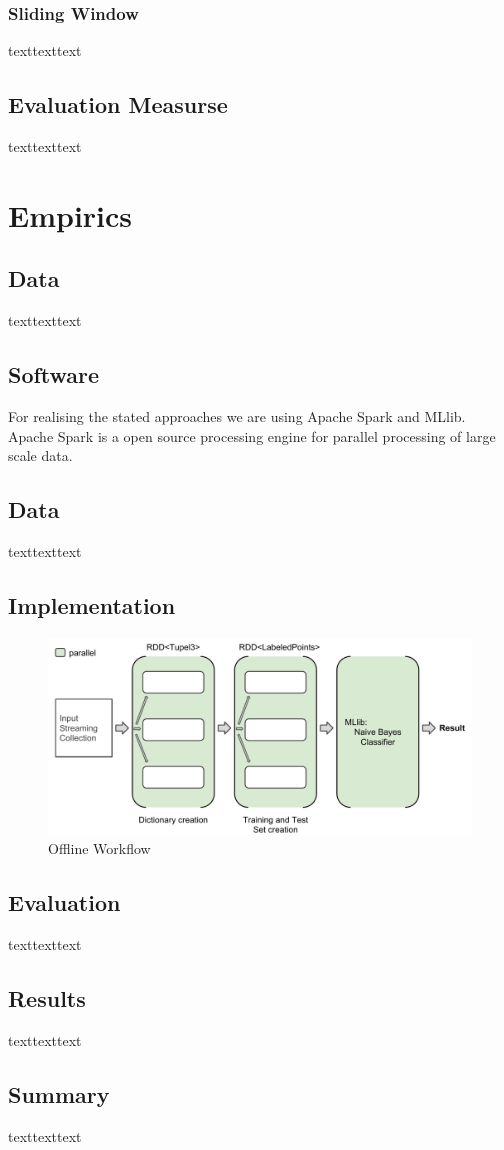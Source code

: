 \documentclass[12pt]{article}
\begin{document}
\subsubsection{Sliding Window}
texttexttext

\subsection{Evaluation Measurse}
texttexttext

\section{Empirics}
\subsection{Data}
texttexttext

\subsection{Software}
For realising the stated approaches we are using Apache Spark and MLlib. Apache Spark is a open source processing engine for parallel processing of large scale data. 


\subsection{Data}
texttexttext

\newpage
\subsection{Implementation}

\begin{figure}[htbp]
  \centering
  \includegraphics[scale=0.56]{VisualisationOfflineWorkflow.pdf}
  \caption{Offline Workflow}
\end{figure}

\subsection{Evaluation}
texttexttext

\subsection{Results}
texttexttext

\subsection{Summary}
texttexttext




\newpage
\medskip

\end{document}
